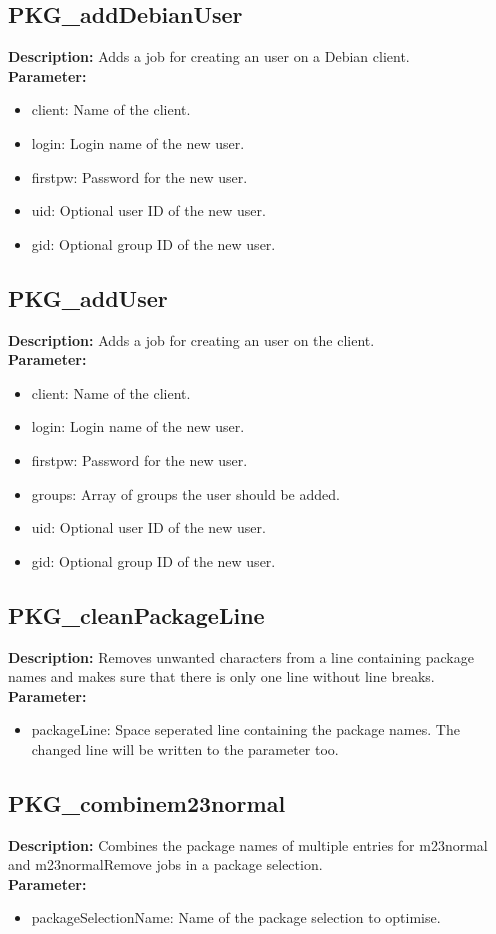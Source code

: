 \subsection{PKG\_addDebianUser}
\textbf{Description:} Adds a job for creating an user on a Debian client.\\
\textbf{Parameter:}
\begin{itemize}
\item client: Name of the client.
\item login: Login name of the new user.
\item firstpw: Password for the new user.
\item uid: Optional user ID of the new user.
\item gid: Optional group ID of the new user.
\end{itemize}

\subsection{PKG\_addUser}
\textbf{Description:} Adds a job for creating an user on the client.\\
\textbf{Parameter:}
\begin{itemize}
\item client: Name of the client.
\item login: Login name of the new user.
\item firstpw: Password for the new user.
\item groups: Array of groups the user should be added.
\item uid: Optional user ID of the new user.
\item gid: Optional group ID of the new user.
\end{itemize}

\subsection{PKG\_cleanPackageLine}
\textbf{Description:} Removes unwanted characters from a line containing package names and makes sure that there is only one line without line breaks.\\
\textbf{Parameter:}
\begin{itemize}
\item packageLine: Space seperated line containing the package names. The changed line will be written to the parameter too.
\end{itemize}

\subsection{PKG\_combinem23normal}
\textbf{Description:} Combines the package names of multiple entries for m23normal and m23normalRemove jobs in a package selection.\\
\textbf{Parameter:}
\begin{itemize}
\item packageSelectionName: Name of the package selection to optimise.
\end{itemize}

